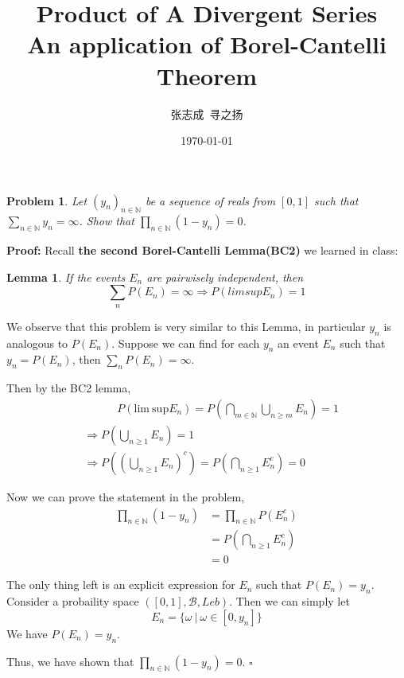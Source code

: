 \documentclass[UTF8, 12pt]{ctexart}
\title{Product of A Divergent Series \\ \large An application of Borel-Cantelli Theorem}
\author{张志成\ 寻之扬}
\date{\today}
\newenvironment{proof}{\noindent\ignorespaces\textbf{Proof:}}{\hfill $\square$\par\noindent}
\newtheorem*{lemma*}{Lemma}
\newtheorem*{problem*}{Problem}
\begin{document}
    \maketitle
    \begin{problem*}
        Let $(y_n)_{n\in\mathbb{N}}$ be a sequence of reals from $[0,1]$ such that $\sum_{n\in\mathbb{N}}y_n = \infty$.
        Show that $\prod_{n\in\mathbb{N}}(1-y_n) = 0$.
    \end{problem*}

    \begin{proof}
        Recall \textbf{the second Borel-Cantelli Lemma(BC2)} we learned in class: 
        \begin{lemma*}
            If the events $E_n$ are pairwisely independent, then $$ \sum_n P(E_n) = \infty \Longrightarrow P(lim sup E_n) = 1 $$
        \end{lemma*} \par
        We observe that this problem is very similar to this Lemma, in particular $y_n$ is analogous to $P(E_n)$. Suppose we can find
        for each $y_n$ an event $E_n$ such that $y_n = P(E_n)$, then $\sum_n P(E_n) = \infty$.
        
        Then by the BC2 lemma, 
        \begin{align*}
            &\quad\quad\quad P(\text{lim}\ \text{sup} E_n) = P(\bigcap_{m\in\mathbb{N}}\bigcup_{n\geq m} E_n) = 1 \\
            &\Longrightarrow P(\bigcup_{n\geq 1} E_n) = 1 \\
            &\Longrightarrow P((\bigcup_{n\geq 1} E_n)^c) = P(\bigcap_{n\geq 1} E_n^c) = 0
        \end{align*}

        Now we can prove the statement in the problem,
        \begin{align*}
            \prod_{n\in\mathbb{N}}(1-y_n) &= \prod_{n\in\mathbb{N}}P(E_n^c)\\
            &= P(\bigcap_{n\geq 1} E_n^c) \\
            &= 0
        \end{align*}

        The only thing left is an explicit expression for $E_n$ such that $P(E_n) = y_n$.
        Consider a probaility space $([0,1], \mathcal{B}, Leb)$.
        Then we can simply let $$ E_n = \{\omega\ |\ \omega \in [0, y_n] \} $$
        We have $P(E_n) = y_n$.

        Thus, we have shown that $\prod_{n\in\mathbb{N}}(1-y_n) = 0$.
    \end{proof}
\end{document}
